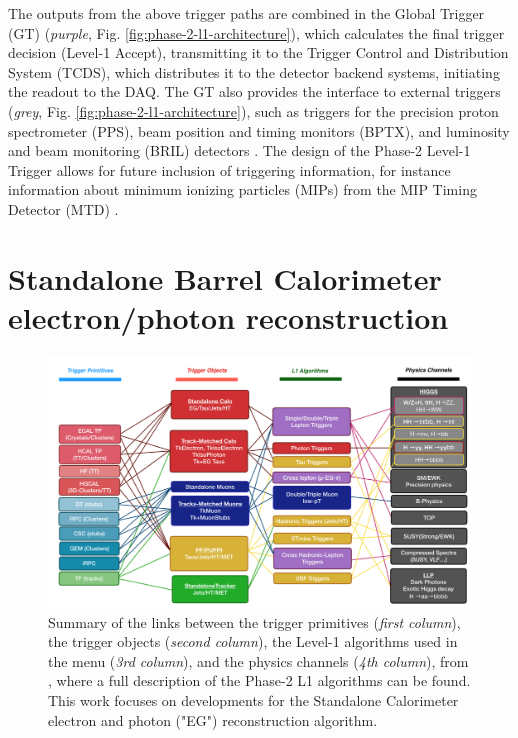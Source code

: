 The outputs from the above trigger paths are combined in the Global Trigger (GT) (\textit{purple}, Fig. \ref{fig:phase-2-l1-architecture}), which calculates the final trigger decision (Level-1 Accept), transmitting it to the Trigger Control and Distribution System (TCDS), which distributes it to the detector backend systems, initiating the readout to the DAQ. The GT also provides the interface to external triggers (\textit{grey}, Fig. \ref{fig:phase-2-l1-architecture}), such as triggers for the precision proton spectrometer (PPS), beam position and timing monitors (BPTX), and luminosity and beam monitoring (BRIL) detectors \cite{CMS-TDR-021}. The design of the Phase-2 Level-1 Trigger allows for future inclusion of triggering information, for instance information about minimum ionizing particles (MIPs) from the MIP Timing Detector (MTD) \cite{CERN-LHCC-2017-027}.

\section{Standalone Barrel Calorimeter electron/photon reconstruction}
\begin{figure}[ht]
    \centering
    \includegraphics[width=15cm]{figures/ch-4-phase2/phase-2-summary-trigger-TP-algo-physics.png}
    \caption[Summary of the links between the trigger primitives, the trigger objects, the Level-1 algorithms, and the physics channels in the Phase-2 menu.]{Summary of the links between the trigger primitives (\textit{first column}), the trigger objects (\textit{second column}), the Level-1 algorithms used in the menu (\textit{3rd column}), and the physics channels (\textit{4th column}), from \cite{CMS-TDR-021}, where a full description of the Phase-2 L1 algorithms can be found. This work focuses on developments for the Standalone Calorimeter electron and photon ("EG") reconstruction algorithm.}
    \label{fig:phase-2-summary-trigger-TP-algo-physics}
\end{figure}

